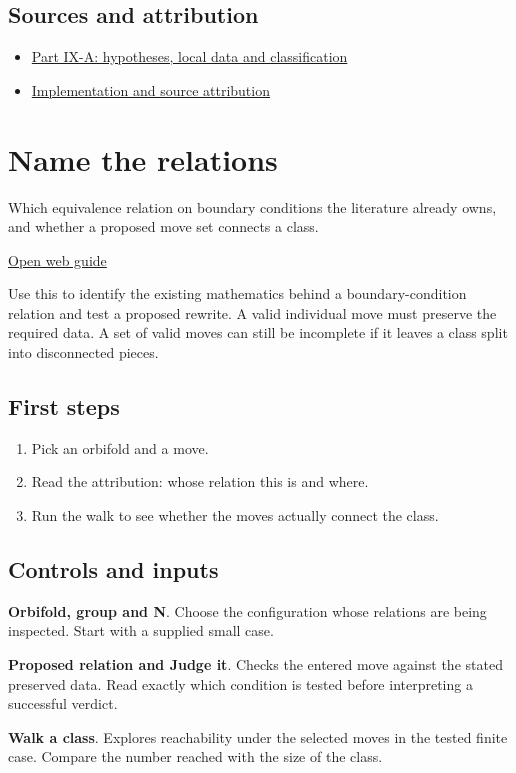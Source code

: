\documentclass[11pt,a4paper]{article}
\begin{document}
\subsection*{Sources and attribution}
\begin{itemize}
\item \href{https://karlesmarin.github.io/ghu-explorer/papers/part-ix-a/index.html}{Part IX-A: hypotheses, local data and classification}
\item \href{https://github.com/karlesmarin/ghu-lab/blob/main/src/sections/orbifold_section.js}{Implementation and source attribution}
\end{itemize}
\section{Name the relations}
Which equivalence relation on boundary conditions the literature already owns, and whether a proposed move set connects a class.

\href{https://karlesmarin.github.io/ghu-explorer/guide/relations/index.html}{Open web guide}

Use this to identify the existing mathematics behind a boundary-condition relation and test a proposed rewrite. A valid individual move must preserve the required data. A set of valid moves can still be incomplete if it leaves a class split into disconnected pieces.
\subsection*{First steps}
\begin{enumerate}
\item Pick an orbifold and a move.
\item Read the attribution: whose relation this is and where.
\item Run the walk to see whether the moves actually connect the class.
\end{enumerate}
\subsection*{Controls and inputs}
\textbf{Orbifold, group and N}. Choose the configuration whose relations are being inspected. Start with a supplied small case.

\textbf{Proposed relation and Judge it}. Checks the entered move against the stated preserved data. Read exactly which condition is tested before interpreting a successful verdict.

\textbf{Walk a class}. Explores reachability under the selected moves in the tested finite case. Compare the number reached with the size of the class.
\end{document}
